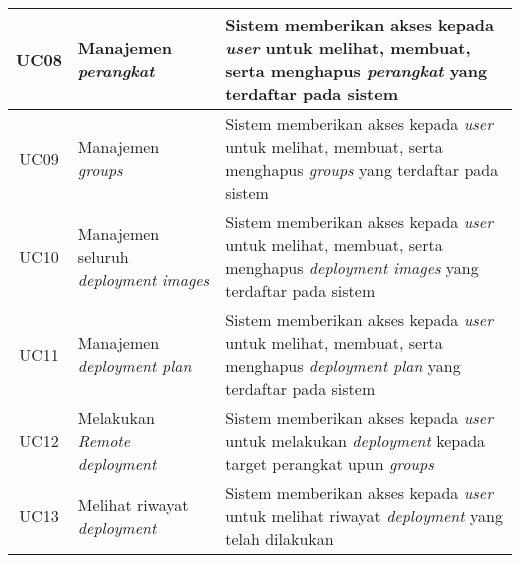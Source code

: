 \begin{table}[ht]
\begin{tabular}{|c|p{4cm}|p{7.5cm}|}
    \hline
    UC08 & Manajemen \textit{perangkat}                          & Sistem memberikan akses kepada \textit{user} untuk melihat, membuat, serta menghapus \textit{perangkat} yang terdaftar pada sistem         \\
    \hline
    UC09 & Manajemen \textit{groups}                             & Sistem memberikan akses kepada \textit{user} untuk melihat, membuat, serta menghapus \textit{groups} yang terdaftar pada sistem            \\
    \hline
    UC10 & Manajemen seluruh \textit{deployment} \textit{images} & Sistem memberikan akses kepada \textit{user} untuk melihat, membuat, serta menghapus \textit{deployment images} yang terdaftar pada sistem \\
    \hline
    UC11 & Manajemen \break \textit{deployment plan}             & Sistem memberikan akses kepada \textit{user} untuk melihat, membuat, serta menghapus \textit{deployment plan} yang terdaftar pada sistem   \\
    \hline
    UC12 & Melakukan \break \textit{Remote deployment}           & Sistem memberikan akses kepada \textit{user} untuk melakukan \textit{deployment} kepada target perangkat upun \textit{groups}              \\
    \hline
    UC13 & Melihat riwayat \break \textit{deployment}            & Sistem memberikan akses kepada \textit{user} untuk melihat riwayat \textit{deployment} yang telah dilakukan                                \\
    \hline
  \end{tabular}
\end{table}
\egroup